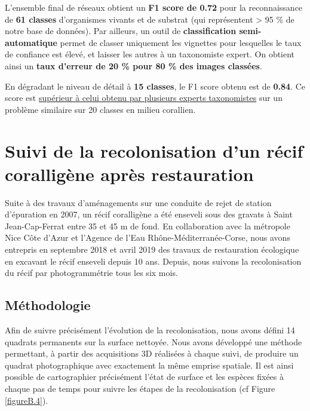 L’ensemble final de réseaux obtient un \textbf{F1 score de 0.72} pour la reconnaissance de \textbf{61 classes} d’organismes vivants et de substrat (qui représentent > 95 \% de notre base de données). Par ailleurs, un outil de \textbf{classification semi-automatique} permet de classer uniquement les vignettes pour lesquelles le taux de confiance est élevé, et laisser les autres à un taxonomiste expert. On obtient ainsi un \textbf{taux d’erreur de 20 \% pour 80 \% des images classées}.


En dégradant le niveau de détail à \textbf{15 classes}, le F1 score obtenu est de \textbf{0.84}. Ce score est \underline{supérieur à celui obtenu par plusieurs experts taxonomistes} sur un problème similaire sur 20 classes en milieu corallien. 


\section*{Suivi de la recolonisation d’un récif coralligène après restauration}
Suite à des travaux d’aménagements sur une conduite de rejet de station d’épuration en 2007, un récif coralligène a été enseveli sous des gravats à Saint Jean-Cap-Ferrat entre 35 et 45 m de fond. En collaboration avec la métropole Nice Côte d’Azur et l’Agence de l’Eau Rhône-Méditerranée-Corse, nous avons entrepris en septembre 2018 et avril 2019 des travaux de restauration écologique en excavant le récif enseveli depuis 10 ans. Depuis, nous suivons la recolonisation du récif par photogrammétrie tous les six mois.

\subsection*{Méthodologie}
Afin de suivre précisément l’évolution de la recolonisation, nous avons défini 14 quadrats permanents sur la surface nettoyée. Nous avons développé une méthode permettant, à partir des acquisitions 3D réalisées à chaque suivi, de produire un quadrat photographique avec exactement la même emprise spatiale. Il est ainsi possible de cartographier précisément l’état de surface et les espèces fixées à chaque pas de temps pour suivre les étapes de la recolonisation (cf Figure \ref{figureB.4}).



